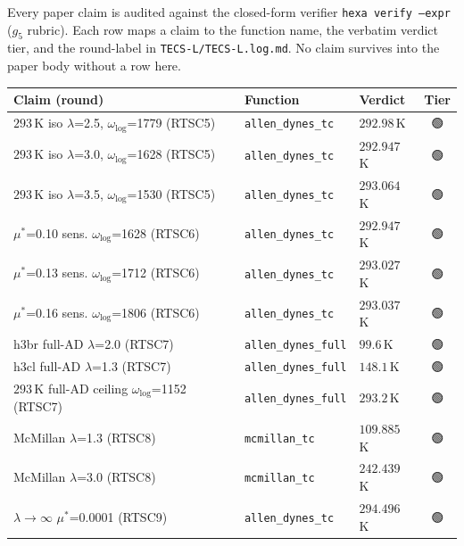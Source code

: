 \documentclass[11pt,a4paper]{article}
\providecommand{\tierGreen}{🟢}
\begin{document}
Every paper claim is audited against the closed-form verifier
\texttt{hexa verify --expr} ($g_5$ rubric). Each row maps a claim to
the function name, the verbatim verdict tier, and the round-label in
\texttt{TECS-L/TECS-L.log.md}. No claim survives into the paper body
without a row here.

\begin{table}[h]
\centering
\small
\begin{tabular}{@{}lllc@{}}
\toprule
\textbf{Claim (round)} & \textbf{Function} & \textbf{Verdict} & \textbf{Tier} \\
\midrule
$293$\,K iso $\lambda$=2.5, $\omega_{\log}$=1779 (RTSC5)    & \texttt{allen\_dynes\_tc}        & $292.98$\,K      & \tierGreen \\
$293$\,K iso $\lambda$=3.0, $\omega_{\log}$=1628 (RTSC5)    & \texttt{allen\_dynes\_tc}        & $292.947$\,K     & \tierGreen \\
$293$\,K iso $\lambda$=3.5, $\omega_{\log}$=1530 (RTSC5)    & \texttt{allen\_dynes\_tc}        & $293.064$\,K     & \tierGreen \\
$\mu^*$=0.10 sens. $\omega_{\log}$=1628 (RTSC6)             & \texttt{allen\_dynes\_tc}        & $292.947$\,K     & \tierGreen \\
$\mu^*$=0.13 sens. $\omega_{\log}$=1712 (RTSC6)             & \texttt{allen\_dynes\_tc}        & $293.027$\,K     & \tierGreen \\
$\mu^*$=0.16 sens. $\omega_{\log}$=1806 (RTSC6)             & \texttt{allen\_dynes\_tc}        & $293.037$\,K     & \tierGreen \\
h3br full-AD $\lambda$=2.0 (RTSC7)                          & \texttt{allen\_dynes\_full}     & $99.6$\,K        & \tierGreen \\
h3cl full-AD $\lambda$=1.3 (RTSC7)                          & \texttt{allen\_dynes\_full}     & $148.1$\,K       & \tierGreen \\
$293$\,K full-AD ceiling $\omega_{\log}$=1152 (RTSC7)       & \texttt{allen\_dynes\_full}     & $293.2$\,K       & \tierGreen \\
McMillan $\lambda$=1.3 (RTSC8)                              & \texttt{mcmillan\_tc}            & $109.885$\,K     & \tierGreen \\
McMillan $\lambda$=3.0 (RTSC8)                              & \texttt{mcmillan\_tc}            & $242.439$\,K     & \tierGreen \\
$\lambda\!\to\!\infty$ $\mu^*$=0.0001 (RTSC9)               & \texttt{allen\_dynes\_tc}        & $294.496$\,K     & \tierGreen \\

\end{tabular}
\end{table}
\end{document}
